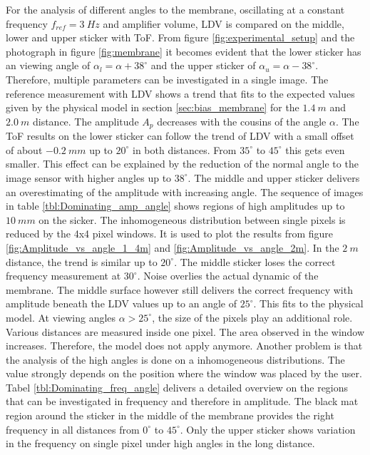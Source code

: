 For the analysis of different angles to the membrane, oscillating at a constant frequency $f_{ref} = 3~Hz$ and amplifier volume, LDV is compared on the middle, lower and upper sticker with ToF. From figure \ref{fig:experimental_setup} and the photograph in figure \ref{fig:membrane} it becomes evident that the lower sticker has an viewing angle of $\alpha_l = \alpha +38^\circ$ and the upper sticker of $\alpha_u =\alpha -38^\circ$. Therefore, multiple parameters can be investigated in a single image. The reference measurement with LDV shows a trend that fits to the expected values given by the physical model in section \ref{sec:bias_membrane} for the $1.4~m$ and $2.0~m$ distance. The amplitude $A_p$ decreases with the cousins of the angle $\alpha$. The ToF results on the lower sticker can follow the trend of LDV with a small offset of about $-0.2~mm$ up to $20^\circ$ in both distances. From $35^\circ$ to $45^\circ$ this gets even smaller. This effect can be explained by the reduction of the normal angle to the image sensor with higher angles up to $38^\circ$. The middle and upper sticker delivers an overestimating of the amplitude with increasing angle. The sequence of images in table \ref{tbl:Dominating_amp_angle} shows regions of high amplitudes up to $10~mm$ on the sicker. The inhomogeneous distribution between single pixels is reduced by the 4x4 pixel windows. It is used to plot the results from figure \ref{fig:Amplitude_vs_angle_1_4m} and \ref{fig:Amplitude_vs_angle_2m}. In the $2~m$ distance, the trend is similar up to $20^\circ$. The middle sticker loses the correct frequency measurement at $30^\circ$. Noise overlies the actual dynamic of the membrane. The middle surface however still delivers the correct frequency with amplitude beneath the LDV values up to an angle of $25^\circ$. This fits to the physical model. At viewing angles $\alpha>25^\circ$, the size of the pixels play an additional role. Various distances are measured inside one pixel. The area observed in the window increases. Therefore, the model does not apply anymore. Another problem is that the analysis of the high angles is done on a inhomogeneous distributions. The value strongly depends on the position where the window was placed by the user. Tabel \ref{tbl:Dominating_freq_angle} delivers a detailed overview on the regions that can be investigated in frequency and therefore in amplitude. The black mat region around the sticker in the middle of the membrane provides the right frequency in all distances from $0^\circ$ to $45^\circ$. Only the upper sticker shows variation in the frequency on single pixel under high angles in the long distance. 

